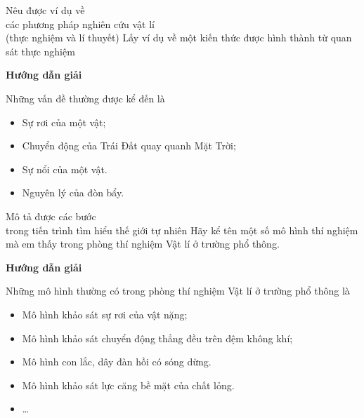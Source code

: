 \begin{dang}{Nêu được ví dụ về \\ các phương pháp nghiên cứu vật lí \\(thực nghiệm và lí thuyết)}
	{Lấy ví dụ về một kiến thức được hình thành từ quan sát thực nghiệm}
	{\begin{center}
			\textbf{Hướng dẫn giải}
	\end{center}
	
	Những vấn đề thường được kể đến là
	\begin{itemize}
		\item Sự rơi của một vật;
		\item Chuyển động của Trái Đất quay quanh Mặt Trời; 
		\item Sự nổi của một vật.
		\item Nguyên lý của đòn bẩy.
	\end{itemize}
	}
\end{dang}
\begin{dang}{Mô tả được các bước \\trong tiến trình tìm hiểu thế giới tự nhiên}
	{Hãy kể tên một số mô hình thí nghiệm mà em thấy trong phòng thí nghiệm Vật lí ở trường phổ thông.}
	{\begin{center}
			\textbf{Hướng dẫn giải}
	\end{center}
	
	Những mô hình thường có trong phòng thí nghiệm Vật lí ở trường phổ thông là
	\begin{itemize}
		\item Mô hình khảo sát sự rơi của vật nặng;
		\item Mô hình khảo sát chuyển động thẳng đều trên đệm không khí;
		\item Mô hình con lắc, dây đàn hồi có sóng dừng.
		\item Mô hình khảo sát lực căng bề mặt của chất lỏng.
		\item \ldots
	\end{itemize}
	}
\end{dang}
